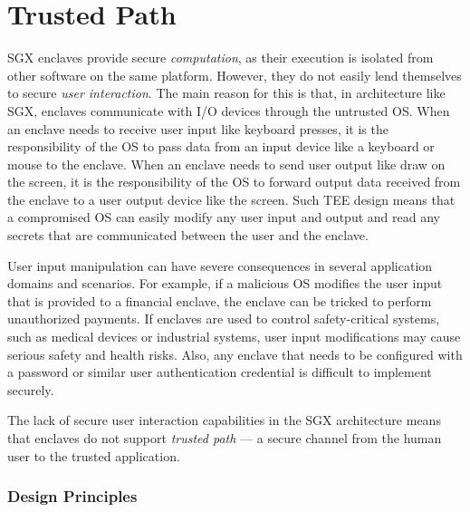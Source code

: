 
\section*{Trusted Path}

SGX enclaves provide secure \emph{computation}, as their execution is isolated from other software on the same platform. However, they do not easily lend themselves to secure \emph{user interaction}. The main reason for this is that, in architecture like SGX, enclaves communicate with I/O devices through the untrusted OS. When an enclave needs to receive user input like keyboard presses, it is the responsibility of the OS to pass data from an input device like a keyboard or mouse to the enclave. When an enclave needs to send user output like draw on the screen, it is the responsibility of the OS to forward output data received from the enclave to a user output device like the screen. Such TEE design means that a compromised OS can easily modify any user input and output and read any secrets that are communicated between the user and the enclave. 

User input manipulation can have severe consequences in several application domains and scenarios. For example, if a malicious OS modifies the user input that is provided to a financial enclave, the enclave can be tricked to perform unauthorized payments. If enclaves are used to control safety-critical systems, such as medical devices or industrial systems, user input modifications may cause serious safety and health risks. Also, any enclave that needs to be configured with a password or similar user authentication credential is difficult to implement securely.

The lack of secure user interaction capabilities in the SGX architecture means that enclaves do not support \emph{trusted path} --- a secure channel from the human user to the trusted application. 



\subsubsection*{Design Principles}

